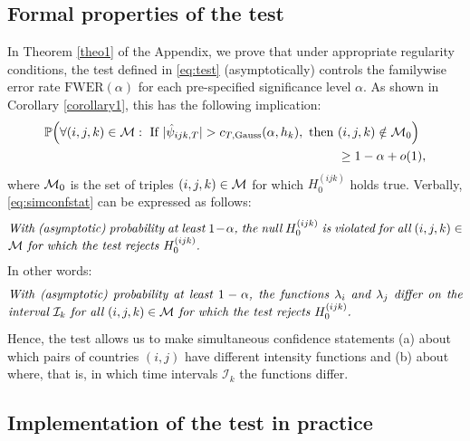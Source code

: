\documentclass[a4paper,12pt]{article}
\numberwithin{equation}{section}
\begin{document}
\subsection{Formal properties of the test}\label{subsec:test:properties}


In Theorem \ref{theo1} of the Appendix, we prove that under appropriate regularity conditions, the test defined in \eqref{eq:test} (asymptotically) controls the familywise error rate $\text{FWER}(\alpha)$ for each pre-specified significance level $\alpha$. As shown in Corollary \ref{corollary1}, this has the following implication: 
\begin{align}
\mathbb{P}\Big( \forall (i,j,k) \in \mathcal{M}: \text{ If } |\hat{\psi}_{ijk,T}| > c_{T,\textnormal{Gauss}}(\alpha,h_k), \text{ then } & (i,j,k) \notin \mathcal{M}_0 \Big) \nonumber \\ & \ge 1 - \alpha + o(1), \label{eq:simconfstat}
\end{align} 
where $\mathcal{M}_0$ is the set of triples $(i,j,k) \in \mathcal{M}$ for which $H_0^{(ijk)}$ holds true. Verbally, \eqref{eq:simconfstat} can be expressed as follows:  
\begin{equation}\label{eq:confidencestatement1}
\begin{minipage}[c][1cm][c]{13cm}
\textit{With (asymptotic) probability at least $1-\alpha$, the null $H_0^{(ijk)}$ is violated for all $(i,j,k) \in \indexset$ for which the test rejects $H_0^{(ijk)}$.} 
\end{minipage}
\end{equation}
In other words: 
\begin{equation}\label{eq:confidencestatement2}
\begin{minipage}[c][1cm][c]{13cm}
\textit{With (asymptotic) probability at least $1-\alpha$, the functions $\lambda_i$ and $\lambda_j$ differ on the interval $\mathcal{I}_k$ for all $(i,j,k) \in \indexset$ for which the test rejects $H_0^{(ijk)}$.} 
\end{minipage}
\end{equation}
Hence, the test allows us to make simultaneous confidence statements (a) about which pairs of countries $(i,j)$ have different intensity functions and (b) about where, that is, in which time intervals $\mathcal{I}_k$ the functions differ.


\subsection{Implementation of the test in practice}
\end{document}
